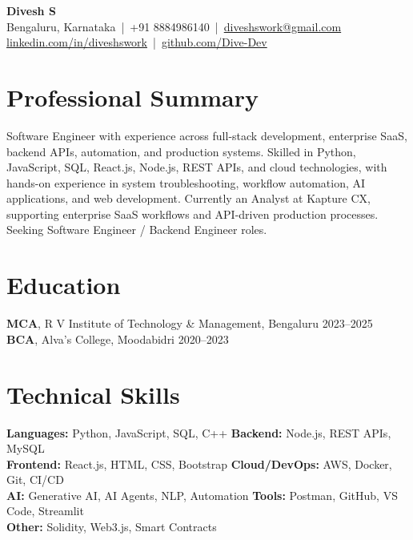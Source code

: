 \documentclass[a4paper,9pt]{article}
\begin{document}
\begin{center}
    {\Large \textbf{Divesh S}}\\[-1pt]
    Bengaluru, Karnataka \,|\, +91 8884986140 \,|\,
    \href{mailto:diveshswork@gmail.com}{diveshswork@gmail.com}\\[-1pt]
    \href{https://linkedin.com/in/diveshswork}{linkedin.com/in/diveshswork}
    \,|\, 
    \href{https://github.com/Dive-Dev}{github.com/Dive-Dev}
\end{center}

\section{Professional Summary}

Software Engineer with experience across full-stack development, enterprise SaaS,
backend APIs, automation, and production systems. Skilled in Python, JavaScript,
SQL, React.js, Node.js, REST APIs, and cloud technologies, with hands-on experience
in system troubleshooting, workflow automation, AI applications, and web development.
Currently an Analyst at Kapture CX, supporting enterprise SaaS workflows and
API-driven production processes. Seeking Software Engineer / Backend Engineer roles.

\section{Education}

\textbf{MCA}, R V Institute of Technology \& Management, Bengaluru
\hfill 2023--2025\\
\textbf{BCA}, Alva's College, Moodabidri
\hfill 2020--2023

\section{Technical Skills}

\textbf{Languages:} Python, JavaScript, SQL, C++ \quad
\textbf{Backend:} Node.js, REST APIs, MySQL\\
\textbf{Frontend:} React.js, HTML, CSS, Bootstrap \quad
\textbf{Cloud/DevOps:} AWS, Docker, Git, CI/CD\\
\textbf{AI:} Generative AI, AI Agents, NLP, Automation \quad
\textbf{Tools:} Postman, GitHub, VS Code, Streamlit\\
\textbf{Other:} Solidity, Web3.js, Smart Contracts
\end{document}
